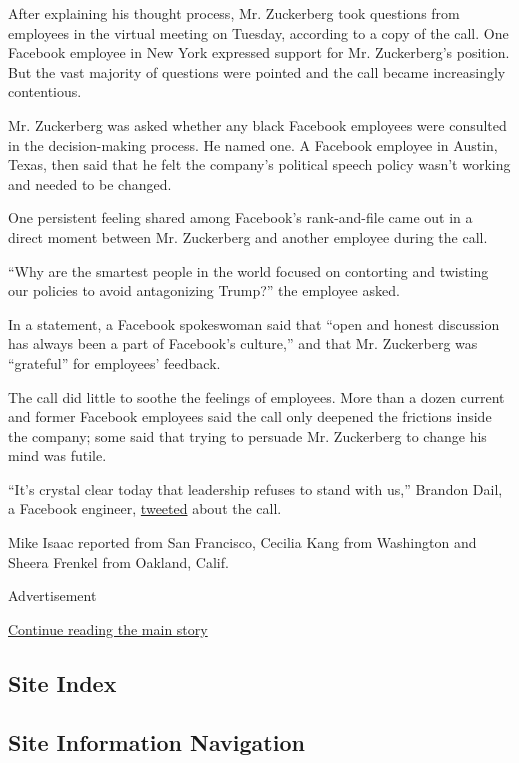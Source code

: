 After explaining his thought process, Mr. Zuckerberg took questions from
employees in the virtual meeting on Tuesday, according to a copy of the
call. One Facebook employee in New York expressed support for Mr.
Zuckerberg's position. But the vast majority of questions were pointed
and the call became increasingly contentious.

Mr. Zuckerberg was asked whether any black Facebook employees were
consulted in the decision-making process. He named one. A Facebook
employee in Austin, Texas, then said that he felt the company's
political speech policy wasn't working and needed to be changed.

One persistent feeling shared among Facebook's rank-and-file came out in
a direct moment between Mr. Zuckerberg and another employee during the
call.

``Why are the smartest people in the world focused on contorting and
twisting our policies to avoid antagonizing Trump?'' the employee asked.

In a statement, a Facebook spokeswoman said that ``open and honest
discussion has always been a part of Facebook's culture,'' and that Mr.
Zuckerberg was ``grateful'' for employees' feedback.

The call did little to soothe the feelings of employees. More than a
dozen current and former Facebook employees said the call only deepened
the frictions inside the company; some said that trying to persuade Mr.
Zuckerberg to change his mind was futile.

``It's crystal clear today that leadership refuses to stand with us,''
Brandon Dail, a Facebook engineer,
\href{https://twitter.com/aweary/status/1267885674805354498}{tweeted}
about the call.

Mike Isaac reported from San Francisco, Cecilia Kang from Washington and
Sheera Frenkel from Oakland, Calif.

Advertisement

\protect\hyperlink{after-bottom}{Continue reading the main story}

\hypertarget{site-index}{%
\subsection{Site Index}\label{site-index}}

\hypertarget{site-information-navigation}{%
\subsection{Site Information
Navigation}\label{site-information-navigation}}

